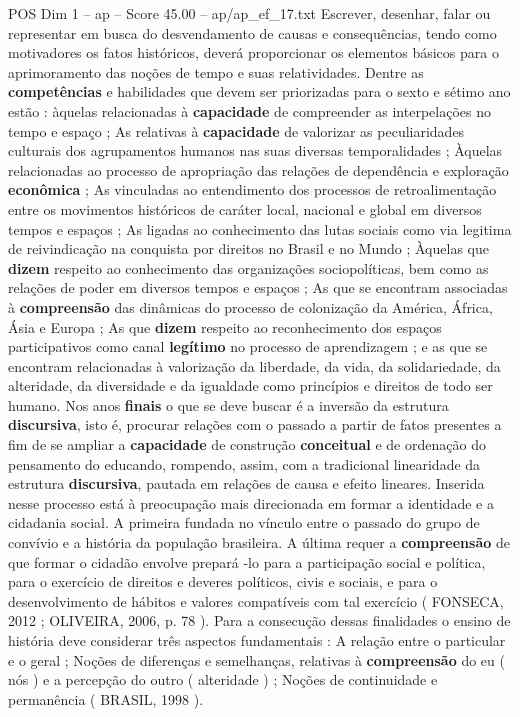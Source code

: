 \begin{textsample}{POS Dim 1 – ap – Score 45.00 – ap/ap\_ef\_17.txt}
Escrever, desenhar, falar ou representar em busca do desvendamento de causas e consequências, tendo como motivadores os fatos históricos, deverá proporcionar os elementos básicos para o aprimoramento das noções de tempo e suas relatividades.
Dentre as \textbf{competências} e habilidades que devem ser priorizadas para o sexto e sétimo ano estão : àquelas relacionadas à \textbf{capacidade} de compreender as interpelações no tempo e espaço ; As relativas à \textbf{capacidade} de valorizar as peculiaridades culturais dos agrupamentos humanos nas suas diversas temporalidades ; Àquelas relacionadas ao processo de apropriação das relações de dependência e exploração \textbf{econômica} ; As vinculadas ao entendimento dos processos de retroalimentação entre os movimentos históricos de caráter local, nacional e global em diversos tempos e espaços ; As ligadas ao conhecimento das lutas sociais como via legitima de reivindicação na conquista por direitos no Brasil e no Mundo ; Àquelas que \textbf{dizem} respeito ao conhecimento das organizações sociopolíticas, bem como as relações de poder em diversos tempos e espaços ; As que se encontram associadas à \textbf{compreensão} das dinâmicas do processo de colonização da América, África, Ásia e Europa ; As que \textbf{dizem} respeito ao reconhecimento dos espaços participativos como canal \textbf{legítimo} no processo de aprendizagem ; e as que se encontram relacionadas à valorização da liberdade, da vida, da solidariedade, da alteridade, da diversidade e da igualdade como princípios e direitos de todo ser humano.
Nos anos \textbf{finais} o que se deve buscar é a inversão da estrutura \textbf{discursiva}, isto é, procurar relações com o passado a partir de fatos presentes a fim de se ampliar a \textbf{capacidade} de construção \textbf{conceitual} e de ordenação do pensamento do educando, rompendo, assim, com a tradicional linearidade da estrutura \textbf{discursiva}, pautada em relações de causa e efeito lineares.
Inserida nesse processo está à preocupação mais direcionada em formar a identidade e a cidadania social.
A primeira fundada no vínculo entre o passado do grupo de convívio e a história da população brasileira.
A última requer a \textbf{compreensão} de que formar o cidadão envolve prepará -lo para a participação social e política, para o exercício de direitos e deveres políticos, civis e sociais, e para o desenvolvimento de hábitos e valores compatíveis com tal exercício ( FONSECA, 2012 ; OLIVEIRA, 2006, p. 78 ).
Para a consecução dessas finalidades o ensino de história deve considerar três aspectos fundamentais : A relação entre o particular e o geral ; Noções de diferenças e semelhanças, relativas à \textbf{compreensão} do eu ( nós ) e a percepção do outro ( alteridade ) ; Noções de continuidade e permanência ( BRASIL, 1998 ).

\end{textsample}
